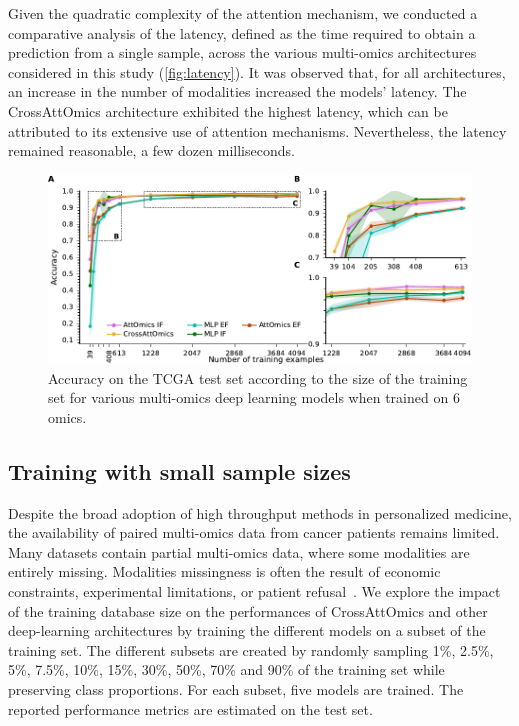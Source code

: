 \documentclass[../main.tex]{subfiles}
\begin{document}
     Given the quadratic complexity of the attention mechanism, we conducted a comparative analysis of the latency, defined as the time required to obtain a prediction from a single sample, across the various multi-omics architectures considered in this study (\cref{fig:latency}).
     It was observed that, for all architectures, an increase in the number of modalities increased the models' latency.
     The CrossAttOmics architecture exhibited the highest latency, which can be attributed to its extensive use of attention mechanisms. Nevertheless, the latency remained reasonable,  a few dozen milliseconds.


     \begin{figure}[htbp]
         \centering
         \includegraphics{limited_training_6_omics.pdf}
         \caption{Accuracy on the TCGA test set according to the size of the training set for various multi-omics deep learning models when trained on 6 omics.}
         \label{fig:lim_train_6_omics}
     \end{figure}
 \subsection{Training with small sample sizes}
     Despite the broad adoption of high throughput methods in personalized medicine, the availability of paired multi-omics data from cancer patients remains limited.
     Many datasets contain partial multi-omics data, where some modalities are entirely missing.
     Modalities missingness is often the result of economic constraints, experimental limitations, or patient refusal~\cite{Kang2021}.
     We explore the impact of the training database size on the performances of CrossAttOmics and other deep-learning architectures by training the different models on a subset of the training set.
     The different subsets are created by randomly sampling 1\%, 2.5\%, 5\%, 7.5\%, 10\%, 15\%, 30\%, 50\%, 70\% and 90\% of the training set while preserving class proportions.
     For each subset, five models are trained.
     The reported performance metrics are estimated on the test set.
\end{document}
